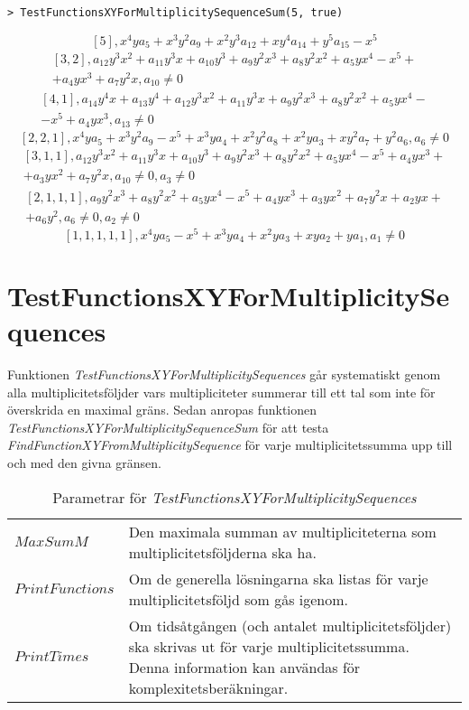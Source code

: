 \begin{verbatim}
> TestFunctionsXYForMultiplicitySequenceSum(5, true)
\end{verbatim}
\[[5], x^4ya_5+x^3y^2a_9+x^2y^3a_{12}+xy^4a_{14}+y^5a_{15}-x^5\]
\[
\begin{array}{c}
[3,2], a_{12}y^3x^2+a_{11}y^3x+a_{10}y^3+a_9y^2x^3+a_8y^2x^2+a_5yx^4-x^5+
\\+a_4yx^3+a_7y^2x, a_{10}\neq 0
\end{array}
\]
\[
\begin{array}{c}
[4,1], a_{14}y^4x+a_{13}y^4+a_{12}y^3x^2+a_{11}y^3x+a_9y^2x^3+a_8y^2x^2+a_5yx^4-\\
-x^5+a_4yx^3, a_{13}\neq 0
\end{array}
\]
\[[2,2,1], x^4ya_5+x^3y^2a_9-x^5+x^3ya_4+x^2y^2a_8+x^2ya_3+xy^2a_7+y^2a_6,a_6\neq 0\]
\[
\begin{array}{c}
[3,1,1], a_{12}y^3x^2+a_{11}y^3x+a_{10}y^3+a_9y^2x^3+a_8y^2x^2+a_5yx^4-x^5+a_4yx^3+\\
+a_3yx^2+a_7y^2x, a_{10}\neq 0, a_3\neq 0
\end{array}
\]
\[
\begin{array}{c}
[2,1,1,1], a_9y^2x^3+a_8y^2x^2+a_5yx^4-x^5+a_4yx^3+a_3yx^2+a_7y^2x+a_2yx+\\
+a_6y^2, a_6\neq 0, a_2\neq 0 
\end{array}
\]
\[[1,1,1,1,1], x^4ya_5-x^5+x^3ya_4+x^2ya_3+xya_2+ya_1, a_1\neq 0\]

\section{TestFunctionsXYForMultiplicitySequences}

Funktionen \emph{TestFunctionsXYForMultiplicitySequences} går systematiskt genom alla multiplicitetsföljder vars multipliciteter summerar till ett tal som inte för överskrida en maximal gräns. Sedan anropas funktionen \emph{TestFunctionsXYForMultiplicitySequenceSum} för att testa \emph{FindFunctionXYFromMultiplicitySequence} för varje multiplicitetssumma upp till och med den givna gränsen.

\begin{table}[h]
\caption{Parametrar för \emph{TestFunctionsXYForMultiplicitySequences}}
\begin{center}
\begin{tabular}{|l|p{9cm}|}
\hline
$MaxSumM$ & Den maximala summan av multipliciteterna som multiplicitetsföljderna ska ha.\\
$PrintFunctions$ & Om de generella lösningarna ska listas för varje multiplicitetsföljd som gås igenom.\\
$PrintTimes$ & Om tidsåtgången (och antalet multiplicitetsföljder) ska skrivas ut för varje multiplicitetssumma. Denna information kan användas för komplexitetsberäkningar.\\
\hline
\end{tabular}
\end{center}
\end{table}

